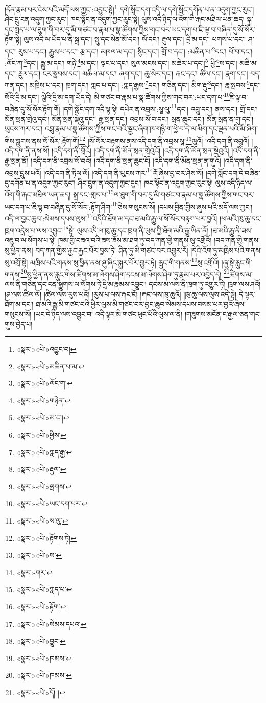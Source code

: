 །དོན་རྣམ་པར་ངེས་པའི་མདོ་ལས་ཀྱང་:འབྱུང་སྟེ།\footnote{«སྣར་»«པེ་»འབྱུང་བ།} དགེ་སློང་དག་འདི་ལ་དགེ་སློང་དགོན་པ་ན་འདུག་ཀྱང་རུང་། ཤིང་དྲུ་ངན་འདུག་ཀྱང་རུང་། ཁང་སྟོང་ན་འདུག་ཀྱང་རུང་སྟེ། ལུས་འདི་ཉིད་ལ་འོག་གི་རྐང་མཐིལ་ཡན་ཆད། སྐྲ་དང་ཀླད་པ་ལ་ཐུག་གི་བར་དུ་མི་གཙང་བ་རྣམ་པ་སྣ་ཚོགས་ཀྱིས་གང་བར་ཡང་དག་པ་ཇི་ལྟ་བ་བཞིན་དུ་སོ་སོར་རྟོག་སྟེ། ལུས་འདི་ལ་ཡོད་པ་ནི་སྐྲ་དང་། སྤུ་དང་སེན་མོ་དང་། སོ་དང་། རྔུལ་དང་། དྲི་མ་དང་། པགས་པ་དང་། ཤ་དང་། རུས་པ་དང་། རྒྱུས་པ་དང་། རྩ་དང་། མཁལ་མ་དང་། སྙིང་དང་། གློ་བ་དང་། :མཆིན་པ་\footnote{«སྣར་»«པེ་»མཆིན་པ་མ་}དང་། ཕོ་བ་དང་། :ལོང་ཀ་\footnote{«སྣར་»«པེ་»ལོང་ག་}དང་། རྒྱུ་མ་དང་། གཉེ་\footnote{«སྣར་»«པེ་»གཉེན་}མ་དང་། ལྒང་པ་དང་། སུལ་མངས་དང་། མཆེར་པ་དང་།\footnote{«སྣར་»«པེ་»མ་ང་།} ཕྱི་\footnote{«སྣར་»«པེ་»ཕྱིས་}ས་དང་། མཆི་མ་དང་། རྔུལ་དང་། ངར་སྣབས་དང་། མཆིལ་མ་དང་། ཞག་དང་། ཆུ་སེར་དང་། རྐང་དང་། ཚིལ་དང་། རྣག་དང་། བད་ཀན་དང་། མཁྲིས་པ་དང་། ཁྲག་དང་། ཀླད་པ་དང་། :ཀླད་རྒྱས་\footnote{«སྣར་»«པེ་»ཀླད་རྒྱ་}དང་། གཅིན་དང་། མིག་རྡུ་\footnote{«སྣར་»«པེ་»རྡུལ་}དང་། རྣ་སྤབས་\footnote{«སྣར་»«པེ་»ལྤགས་}དང་། སོའི་དྲི་མ་དང་། ལྕེའི་དྲི་མ་དག་ཡོད་དེ། མི་གཙང་བ་རྣམ་པ་སྣ་ཚོགས་ཀྱིས་གང་བར་:ཡང་དག་པ་\footnote{«སྣར་»«པེ་»ཡང་དག་པར་}ཇི་ལྟ་བ་བཞིན་དུ་སོ་སོར་རྟོག་གོ། །དགེ་སློང་དག་འདི་ལྟ་སྟེ། དཔེར་ན་འབྲས་:སཱ་ལུ་\footnote{«སྣར་»«པེ་»ས་ལུ་}དང་། འབྲུ་དང་། ནས་དང་། གྲོ་དང་། མོན་སྲན་གྲེའུ་དང་། མོན་སྲན་སྡེའུ་དང་། རྒྱ་སྲན་དང་། འབྲས་སོ་བ་དང་། སྲན་ཆུང་དང་། མོན་སྲན་ན་གུ་དང་། ཡུངས་ཀར་དང་། འབྲུ་རྣམ་པ་སྣ་ཚོགས་ཀྱིས་གང་བའི་སྦྱང་ཞིག་ཁ་གཉི་ག་ཕྱེ་བ་དེ་ལ་མིག་དང་ལྡན་པའི་མི་ཞིག་གིས་བླུགས་ནས་སོ་སོར་:རྟོག་གོ།\footnote{«སྣར་»«པེ་»རྟོགས་ཏེ།} །སོ་སོར་བརྟགས་ནས་འདི་དག་ནི་འབྲས་སཱ་\footnote{«སྣར་»«པེ་»ས་}ལུའོ། །འདི་དག་ནི་འབྲུའོ། །འདི་དག་ནི་ནས་སོ། །འདི་དག་ནི་གྲོའོ། །འདི་དག་ནི་མོན་སྲན་གྲེའུའོ། །འདི་དག་ནི་མོན་སྲན་སྡེའུའོ། །འདི་དག་ནི་རྒྱ་སྲན་ནོ། །འདི་དག་ནི་འབྲས་སོ་བའོ། །འདི་དག་ནི་སྲན་ཆུང་ངོ། །འདི་དག་ནི་མོན་སྲན་ན་གུའོ། །འདི་དག་ནི་འབྲས་དྲུས་པའོ། །འདི་དག་ནི་ཏིལ་ལོ། །འདི་དག་ནི་ཡུངས་ཀར་\footnote{«སྣར་»གར་}རོ་ཞེས་བྱ་བར་ཤེས་སོ། །དགེ་སློང་དག་དེ་བཞིན་དུ་དགོན་པ་ན་འདུག་ཀྱང་རུང་། ཤིང་དྲུག་ན་འདུག་ཀྱང་དུང་། ཁང་སྟོང་ན་འདུག་ཀྱང་རུང་སྟེ། ལུས་འདི་ཉིད་ལ་འོག་གི་རྐང་མཐིལ་ཡན་ཆད། སྐྲ་དང་:གླད་པ་\footnote{«སྣར་»«པེ་»ཀླད་པ་}ལ་ཐུག་གི་བར་དུ་མི་གཙང་བ་རྣམ་པ་སྣ་ཚོགས་ཀྱིས་གང་བར་ཡང་དག་པ་ཇི་ལྟ་བ་བཞིན་དུ་སོ་སོར་:རྟོག་ཤིག་\footnote{«སྣར་»«པེ་»རྟོག་}ཅེས་གསུངས་སོ། །དཔས་བྱིན་གྱིས་ཞུས་པའི་མདོ་ལས་ཀྱང་། འདི་ལ་བྱང་ཆུབ་:སེམས་དཔས་ལུས་\footnote{«སྣར་»«པེ་»སེམས་དཔའ་}འདིའི་ཐོག་མ་དང་ཐ་མའི་རྒྱུ་ལ་སོ་སོར་བརྟག་པར་བྱའོ། །ཕ་མའི་ཁུ་ཆུ་དང་ཁྲག་འདྲེས་པ་ལས་འབྱུང་\footnote{«སྣར་»«པེ་»བྱུང་}སྟེ། ལུས་འདི་ལ་ཁུ་ཆུ་དང་ཁྲག་ནི་ལུས་ཀྱི་ཐོག་མའི་རྒྱུ་ཡིན་ནོ། །ཐ་མའི་རྒྱུ་ནི་ཟས་འཇུ་བ་ལ་སོགས་པ་སྟེ། ཁམ་གྱི་བཟའ་བའི་ཟས་ཟོས་མ་ཐག་ཏུ་བད་ཀན་གྱི་གནས་སུ་འགྲོའོ། །བད་ཀན་གྱི་གནས་སུ་ཕྱིན་ནས། བད་ཀན་གྱིས་རྐྱང་རྐྱང་པོར་བྱས་ཏེ། ཤིན་ཏུ་མི་གཙང་བར་འགྱུར་རོ། །དེའི་འོག་ཏུ་མཁྲིས་པའི་གནས་སུ་འགྲོ་སྟེ། མཁྲིས་པའི་གནས་སུ་ཕྱིན་ནས་ཞུ་ཞིང་སྐྱུར་པོར་གྱུར་ཏེ། རླུང་གི་གནས་\footnote{«སྣར་»«པེ་»ཁམས་}སུ་འགྲོའོ། །ཞུ་སྟེ་རླུང་གི་གནས་\footnote{«སྣར་»«པེ་»ཁམས་}སུ་ཕྱིན་ནས་རླུང་གིས་ཚིགས་མ་ལོགས་ཤིག་དངས་མ་ལོགས་ཤིག་ཏུ་རྣམ་པར་འབྱེད་དེ། \footnote{«སྣར་»«པེ་»དོ། ། }ཚིགས་མ་ལས་ནི་གཅིན་དང་ངན་སྐྱུགས་ལ་སོགས་ཏེ་དྲི་མ་རྣམས་འབྱུང་། དངས་མ་ལས་ནི་ཁྲག་ཏུ་འགྱུར་ཏེ། ཁྲག་ལས་ཤའོ། །ཤ་ལས་ཚིལ་ལོ། །ཚིལ་ལས་རུས་པའོ། །རུས་པ་ལས་རྐང་ངོ། །རྐང་ལས་ཁུ་ཆུའོ། །ཁུ་ཆུ་ལས་ལུས་འདི་སྟེ། དེ་ལྟར་ཐོག་མ་དང་། ཐ་མའི་རྒྱུ་མི་གཙང་བའི་ཕྱིར་ལུས་མི་གཙང་བར་བྱང་ཆུབ་སེམས་དཔས་བསམ་པར་བྱའོ་ཞེས་གསུངས་སོ། །ཡང་དེ་ཉིད་ལས་འབྱུང་བ། འདི་ལྟར་མི་གཙང་ཕུང་པོའི་ལུས་ལ་ནི། །གཟུགས་མངོན་ང་རྒྱལ་ཅན་གང་གུས་བྱེད་པ། 